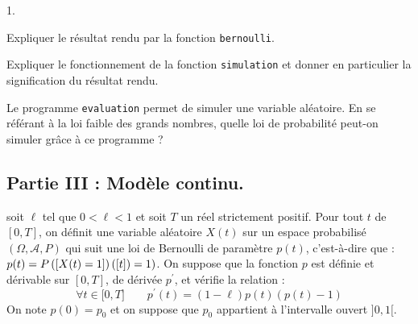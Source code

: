 \documentclass[11pt]{article}%
\begin{document}
\begin{noliste}{1.}
 \setlength{\itemsep}{4mm}
\item Expliquer le résultat rendu par la fonction \texttt{bernoulli}.

\item Expliquer le fonctionnement de la fonction \texttt{simulation} et
donner en particulier la signification du résultat rendu.

\item Le programme \texttt{evaluation} permet de simuler une variable
aléatoire. En se référant à la loi faible des grands nombres, quelle
loi de probabilité peut-on simuler grâce à ce programme ?
\end{noliste}

\subsection*{Partie III : Modèle continu.}

soit $\ell $ tel que $0<\ell <1$ et soit $T$ un réel strictement
positif.
Pour tout $t$ de $[0,T]$, on définit une variable aléatoire $X(t)$ sur
un
espace probabilisé $(\Omega,\mathcal{A},P)$ qui suit une loi de
Bernoulli
de paramètre $p(t)$, c'est-à-dire que : $p(t) = P\left(\left[ {X(t) =
1} \right]\right)\left(\left[ {t} \right]\right) = 1)$. On suppose que la
fonction $p$ est définie et dérivable sur $[0,T]$, de dérivée
$p^{\prime }$,
et vérifie la relation :
\[
\forall t\in \lbrack 0,T]\qquad p^{\prime }(t) = (1-\ell )p(t)(p(t)-1)
\]
On note $p(0) = p_{0}$ et on suppose que $p_{0}$ appartient à
l'intervalle
ouvert $]0,1[$.
\end{document}
